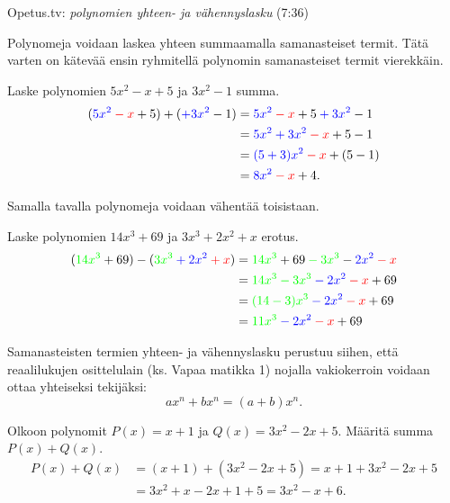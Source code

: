 {Opetus.tv: \emph{polynomien yhteen- ja vähennyslasku} (7:36)}

Polynomeja voidaan laskea yhteen summaamalla samanasteiset termit. Tätä varten on kätevää ensin ryhmitellä polynomin samanasteiset termit vierekkäin.

\begin{esimerkki}
Laske polynomien $5x^2-x+5$ ja $3x^2-1$ summa.
   \begin{align*}
        (\textcolor{blue}{5x^2} \textcolor{red}{{}-x} + 5) + (\textcolor{blue}{+3x^2} -1) 
        &=\textcolor{blue}{5x^2} \textcolor{red}{{}-x} + 5  \textcolor{blue}{{}+3x^2} -1 \\
        &=\textcolor{blue}{5x^2+3x^2} \textcolor{red}{{}-x} +5-1\\
        &=\textcolor{blue}{(5+3)x^2} \textcolor{red}{{}-x}+(5-1)\\
        &=\textcolor{blue}{8x^2} \textcolor{red}{{}-x}+4.
    \end{align*}
\end{esimerkki}

Samalla tavalla polynomeja voidaan vähentää toisistaan.

\begin{esimerkki}
    Laske polynomien $14x^3+69$ ja $3x^3+2x^2+x$ erotus.
    \begin{align*}
        (\textcolor{green}{14x^3} + 69) - (\textcolor{green}{3x^3} \textcolor{blue}{{}+ 2x^2} \textcolor{red}{{}+x})
        &= \textcolor{green}{14x^3} + 69 \textcolor{green}{{}-3x^3} - 
            \textcolor{blue}{2x^2} \textcolor{red}{{}-x} \\
        &= \textcolor{green}{14x^3{}-3x^3} \textcolor{blue}{{}-2x^2} \textcolor{red}{{}-x} + 69 \\
        &= \textcolor{green}{(14{}-3)x^3} \textcolor{blue}{{}-2x^2} \textcolor{red}{{}-x} + 69 \\
        &= \textcolor{green}{11x^3} \textcolor{blue}{{}-2x^2} \textcolor{red}{{}-x} + 69
    \end{align*}
\end{esimerkki}
    
Samanasteisten termien yhteen- ja vähennyslasku perustuu siihen, että reaalilukujen osittelulain (ks. Vapaa matikka 1) nojalla vakiokerroin voidaan
ottaa yhteiseksi tekijäksi:
\[
ax^n+bx^n=(a+b)x^n.
\]

  
\begin{esimerkki}
Olkoon polynomit $P(x)=x+1$ ja $Q(x)=3x^2-2x+5$. Määritä summa $P(x)+Q(x)$.
   \begin{align*}
        P(x)+Q(x)&=(x+1)+(3x^2-2x+5) = x+1+3x^2-2x+5 \\
                 &= 3x^2+x-2x+1+5 =3x^2-x+6.
    \end{align*}
\end{esimerkki}

